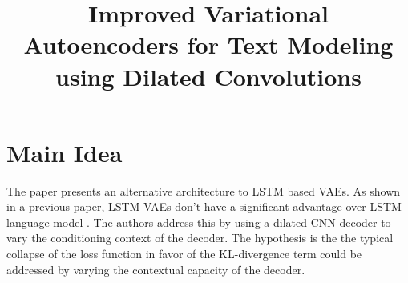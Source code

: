 \documentclass[12pt]{scrartcl}
\begin{document}
\title{Improved Variational Autoencoders for Text Modeling using Dilated Convolutions}
\author{}
\date{}
\maketitle

\section{Main Idea}
  The paper \cite{yang2017improved} presents an alternative architecture to LSTM based VAEs. As shown in a previous paper, LSTM-VAEs don't have a significant advantage over LSTM language model \cite{bowman2016generating}. The authors address this by using a dilated CNN decoder to vary the conditioning context of the decoder. The hypothesis is the the typical collapse of the loss function in favor of the KL-divergence term could be addressed by varying the contextual capacity of the decoder.
\end{document}
